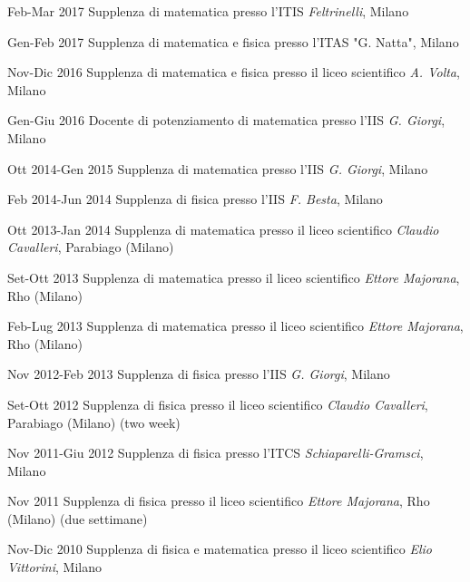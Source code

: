 \begin{CV}
	\item[Feb-Mar 2017] Supplenza di matematica presso l'ITIS {\em Feltrinelli}, Milano
	
	\item[Gen-Feb 2017] Supplenza di matematica e fisica presso l'ITAS "G. Natta", Milano
	
	\item[Nov-Dic 2016] Supplenza di matematica e fisica presso il liceo scientifico {\em A. Volta}, Milano
	
	\item[Gen-Giu 2016] Docente di potenziamento di matematica presso l'IIS {\em G. Giorgi}, Milano
	
	\item[Ott 2014-Gen 2015] Supplenza di matematica presso l'IIS {\em G. Giorgi}, Milano
	
	\item[Feb 2014-Jun 2014] Supplenza di fisica presso l'IIS {\em F. Besta}, Milano
	
	\item[Ott 2013-Jan 2014] Supplenza di matematica presso il liceo scientifico {\em Claudio Cavalleri}, Parabiago (Milano)
	
	\item[Set-Ott 2013] Supplenza di matematica presso il liceo scientifico {\em Ettore Majorana}, Rho (Milano)
	
	\item[Feb-Lug 2013] Supplenza di matematica presso il liceo scientifico {\em Ettore Majorana}, Rho (Milano)
	
	\item[Nov 2012-Feb 2013] Supplenza di fisica presso l'IIS {\em G. Giorgi}, Milano
	
	\item[Set-Ott 2012] Supplenza di fisica presso il liceo scientifico {\em Claudio Cavalleri}, Parabiago (Milano) (two week)
	
	\item[Nov 2011-Giu 2012] Supplenza di fisica presso l'ITCS {\em Schiaparelli-Gramsci}, Milano
	
	\item[Nov 2011] Supplenza di fisica presso il liceo scientifico {\em Ettore Majorana}, Rho (Milano) (due settimane)
	
	\item[Nov-Dic 2010] Supplenza di fisica e matematica presso il liceo scientifico {\em Elio Vittorini}, Milano
	

\end{CV}
